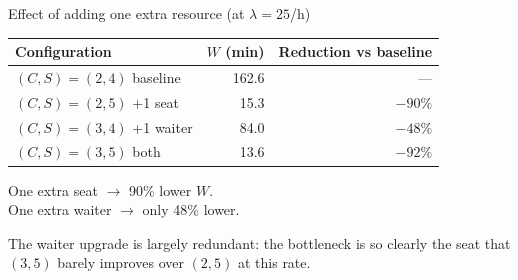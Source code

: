 \documentclass[10pt,aspectratio=169]{beamer}
\begin{document}
\begin{frame}{Effect of adding one extra resource (at $\lambda = 25$/h)}
\begin{table}
\centering
\begin{tabular}{l r r}
\toprule
Configuration & $W$ (min) & Reduction vs baseline \\
\midrule
$(C,S) = (2,4)$ baseline   & 162.6 & --- \\
$(C,S) = (2,5)$ +1 seat    & \alert{15.3} & \alert{$-90\%$} \\
$(C,S) = (3,4)$ +1 waiter  & 84.0  & $-48\%$ \\
$(C,S) = (3,5)$ both       & 13.6  & $-92\%$ \\
\bottomrule
\end{tabular}
\end{table}

\vspace{0.6cm}
\begin{center}
\Large
\alert{One extra seat $\to$ 90\% lower $W$.} \\
\alert{One extra waiter $\to$ only 48\% lower.}
\end{center}

\vspace{0.4cm}
The waiter upgrade is largely redundant: the bottleneck is so clearly the seat that
$(3,5)$ barely improves over $(2,5)$ at this rate.
\end{frame}

\end{document}
